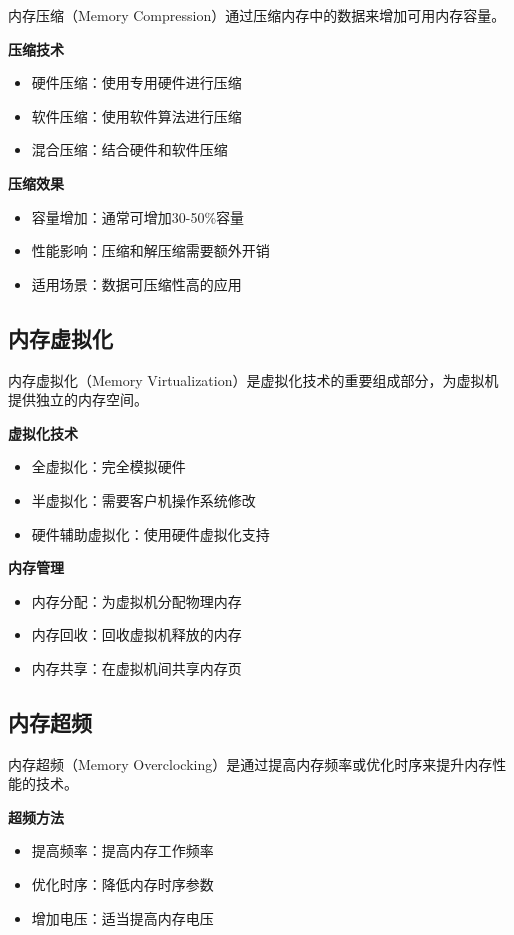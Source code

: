 \documentclass{article}
\begin{document}
内存压缩（Memory Compression）通过压缩内存中的数据来增加可用内存容量。

\textbf{压缩技术}
\begin{itemize}
    \item 硬件压缩：使用专用硬件进行压缩
    \item 软件压缩：使用软件算法进行压缩
    \item 混合压缩：结合硬件和软件压缩
\end{itemize}

\textbf{压缩效果}
\begin{itemize}
    \item 容量增加：通常可增加30-50\%容量
    \item 性能影响：压缩和解压缩需要额外开销
    \item 适用场景：数据可压缩性高的应用
\end{itemize}

\subsection{内存虚拟化}

内存虚拟化（Memory Virtualization）是虚拟化技术的重要组成部分，为虚拟机提供独立的内存空间。

\textbf{虚拟化技术}
\begin{itemize}
    \item 全虚拟化：完全模拟硬件
    \item 半虚拟化：需要客户机操作系统修改
    \item 硬件辅助虚拟化：使用硬件虚拟化支持
\end{itemize}

\textbf{内存管理}
\begin{itemize}
    \item 内存分配：为虚拟机分配物理内存
    \item 内存回收：回收虚拟机释放的内存
    \item 内存共享：在虚拟机间共享内存页
\end{itemize}

\subsection{内存超频}

内存超频（Memory Overclocking）是通过提高内存频率或优化时序来提升内存性能的技术。

\textbf{超频方法}
\begin{itemize}
    \item 提高频率：提高内存工作频率
    \item 优化时序：降低内存时序参数
    \item 增加电压：适当提高内存电压
\end{itemize}
\end{document}
